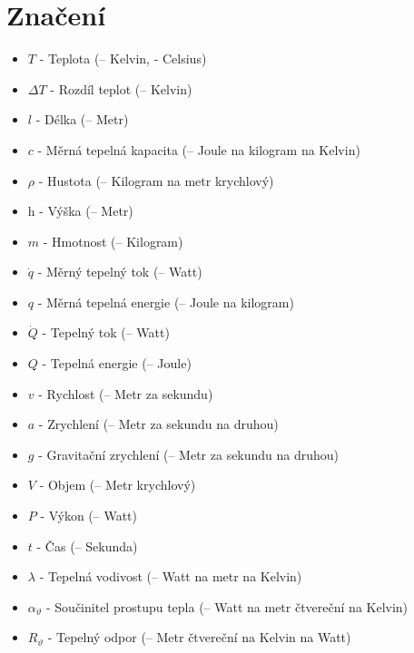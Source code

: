 \documentclass{article}
\begin{document}
\maketitle
\tableofcontents
\newpage



\section{Značení}

\begin{itemize}
    \item $T$ - Teplota (\ueqK \myFS -- Kelvin, \ueqCELS \myFS - Celsius)
    \item $\Delta T$ - Rozdíl teplot (\ueqK \myFS -- Kelvin)
    \item $l$ - Délka (\ueqM \myFS -- Metr)
    \item $c$ - Měrná tepelná kapacita (\ueqJandKGinvKinv \myFS -- Joule na kilogram na Kelvin)
    \item $\rho$ - Hustota (\ueqKGandMinvcu \myFS -- Kilogram na metr krychlový)
    \item h - Výška (\ueqM \myFS -- Metr)
    \item $m$ - Hmotnost (\ueqKG \myFS -- Kilogram)
    \item $\dot{q}$ - Měrný tepelný tok (\ueqWandMinvsq \myFS -- Watt)
    \item $q$ - Měrná tepelná energie (\ueqJandMinvsq \myFS -- Joule na kilogram)
    \item $\dot{Q}$ - Tepelný tok (\ueqW \myFS -- Watt)
    \item $Q$ - Tepelná energie (\ueqJ \myFS -- Joule)
    \item $v$ - Rychlost (\ueqMandSinv \myFS -- Metr za sekundu)
    \item $a$ - Zrychlení (\ueqMandSinvsq \myFS -- Metr za sekundu na druhou)
    \item $g$ - Gravitační zrychlení (\ueqMandSinvsq \myFS -- Metr za sekundu na druhou)
    \item $V$ - Objem (\ueqMcu \myFS -- Metr krychlový)
    \item $P$ - Výkon (\ueqW \myFS -- Watt)
    \item $t$ - Čas (\ueqS \myFS -- Sekunda)
    \item $\lambda$ - Tepelná vodivost (\ueqWandMinvKinv \myFS -- Watt na metr na Kelvin)
    \item $\alpha_{\vartheta}$ - Součinitel prostupu tepla (\ueqWandMinvsqKinv \myFS -- Watt na metr čtvereční na Kelvin)
    \item $R_{\vartheta}$ - Tepelný odpor (\ueqMsqKandWinv \myFS -- Metr čtvereční na Kelvin na Watt)
\end{itemize}
\end{document}
